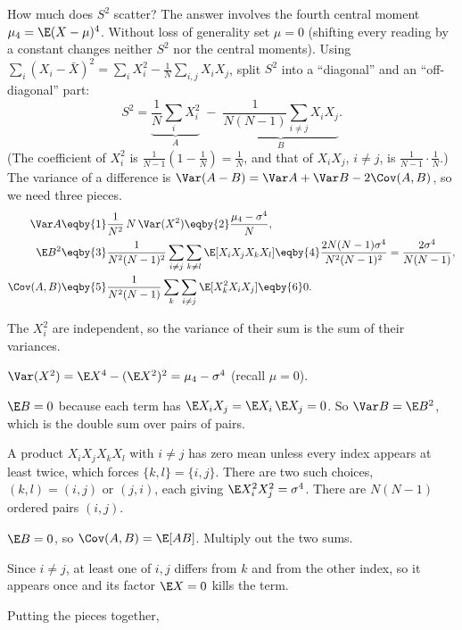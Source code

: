How much does $S^2$ scatter? The answer involves the fourth central moment
$\mu_4=\E(X-\mu)^4$. Without loss of generality set $\mu=0$ (shifting every
reading by a constant changes neither $S^2$ nor the central moments). Using
$\sum_i(X_i-\bar X)^2=\sum_iX_i^2-\frac1N\sum_{i,j}X_iX_j$, split $S^2$ into
a ``diagonal'' and an ``off-diagonal'' part:
\begin{equation}
  S^2=\underbrace{\frac1N\sum_{i}X_i^2}_{A}\;-\;
  \underbrace{\frac{1}{N(N-1)}\sum_{i\neq j}X_iX_j}_{B} .
  \label{3a:eq:s2-split}
\end{equation}
(The coefficient of $X_i^2$ is $\frac{1}{N-1}(1-\frac1N)=\frac1N$, and that of
$X_iX_j$, $i\neq j$, is $\frac{1}{N-1}\cdot\frac1N$.) The variance of a
difference is $\Var(A-B)=\Var A+\Var B-2\Cov(A,B)$, so we need three pieces.
\begin{align}
  \Var A
  &\eqby{1} \frac{1}{N^2}\,N\,\Var(X^2)
   \eqby{2} \frac{\mu_4-\sigma^4}{N}, \label{3a:eq:varA}\\
  \E B^2
  &\eqby{3} \frac{1}{N^2(N-1)^2}\sum_{i\neq j}\sum_{k\neq l}\E[X_iX_jX_kX_l]
   \eqby{4} \frac{2N(N-1)\sigma^4}{N^2(N-1)^2}
   = \frac{2\sigma^4}{N(N-1)}, \label{3a:eq:varB}\\
  \Cov(A,B)
  &\eqby{5} \frac{1}{N^2(N-1)}\sum_k\sum_{i\neq j}\E[X_k^2X_iX_j]
   \eqby{6} 0 . \label{3a:eq:covAB}
\end{align}
\begin{explain}
  \item The $X_i^2$ are independent, so the variance of their sum is the sum of their variances.
  \item $\Var(X^2)=\E X^4-(\E X^2)^2=\mu_4-\sigma^4$ (recall $\mu=0$).
  \item $\E B=0$ because each term has $\E X_iX_j=\E X_i\,\E X_j=0$. So
        $\Var B=\E B^2$, which is the double sum over pairs of pairs.
  \item A product $X_iX_jX_kX_l$ with $i\neq j$ has zero mean unless every index
        appears at least twice, which forces $\{k,l\}=\{i,j\}$. There are two
        such choices, $(k,l)=(i,j)$ or $(j,i)$, each giving
        $\E X_i^2X_j^2=\sigma^4$. There are $N(N-1)$ ordered pairs $(i,j)$.
  \item $\E B=0$, so $\Cov(A,B)=\E[AB]$. Multiply out the two sums.
  \item Since $i\neq j$, at least one of $i,j$ differs from $k$ and from the
        other index, so it appears once and its factor $\E X=0$ kills the term.
\end{explain}
Putting the pieces together,
